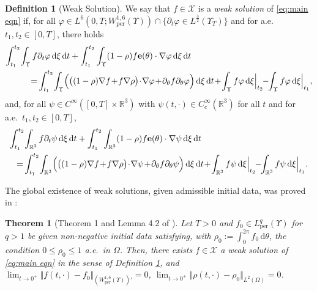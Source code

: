 \documentclass[11pt,a4paper,reqno]{amsart}
\newtheorem{thm}{Theorem}
\theoremstyle{remark}
\theoremstyle{definition}
\newtheorem{definition}[prop]{Definition}
\numberwithin{equation}{section}
\newcommand{\per}{\mathrm{per}}
\newcommand{\e}{{\bf e}}
\newcommand{\bxi}{\xi}
\renewcommand{\d}{\, \mathrm{d} }
\begin{document}
    \begin{definition}[Weak Solution]\label{def:weak sol}
        We say that $f \in \mathcal{X}$ is a \emph{weak solution} of \eqref{eq:main eqn} if, for all $\varphi \in L^6(0,T;W^{1,6}_\per(\Upsilon)) \cap\{\partial_t \varphi \in L^{\frac{3}{2}}(\Upsilon_T)\}$ and for a.e.~$t_1,t_2 \in [0,T]$, there holds 
  \begin{equation}\label{eq:weak sol}
    \begin{aligned}
     \int_{t_1}^{t_2}\! \int_{\Upsilon} f & \partial_t \varphi \d \bxi \d t + \int_{t_1}^{t_2} \int_{\Upsilon} (1-\rho) f \e(\theta) \cdot \nabla \varphi \d \bxi \d t \\ 
      =&\int_{t_1}^{t_2} \!\int_{\Upsilon} \!\Big( \big((1-\rho)\nabla f \!+\! f \nabla \rho \big) \!\cdot\! \nabla \varphi \!+\! \partial_\theta f\partial_\theta \varphi \Big) \d \bxi \d t \!+\! \int_{\Upsilon} f \varphi \d\bxi \Big|_{t_2} \!\!-\!\! \int_{\Upsilon} f \varphi \d\bxi \Big|_{t_1}, 
    \end{aligned}
\end{equation}
        and, for all $\psi \in C^\infty([0,T]\times\mathbb{R}^3)$ with $\psi(t,\cdot) \in C^\infty_c(\mathbb{R}^3)$ for all $t$ and for a.e.~$t_1,t_2 \in [0,T]$, 
      \begin{equation}\label{eq:weak sense eq}
    \begin{aligned}
      \int_{t_1}^{t_2}\! & \int_{\mathbb{R}^3} f  \partial_t \psi \d \bxi \d t + \int_{t_1}^{t_2} \int_{\mathbb{R}^3} (1-\rho) f \e(\theta) \cdot \nabla \psi \d \bxi \d t \\ 
      =&\int_{t_1}^{t_2} \!\int_{\mathbb{R}^3} \!\Big( \big((1-\rho)\nabla f \!+\! f \nabla \rho \big) \!\cdot\! \nabla \psi \!+\! \partial_\theta f\partial_\theta \psi \Big) \d \bxi \d t \!+\! \int_{\mathbb{R}^3} f \psi \d\bxi \Big|_{t_2} \!\!-\!\! \int_{\mathbb{R}^3} f \psi \d\bxi \Big|_{t_1}. 
    \end{aligned}
\end{equation}
    \end{definition}

The global existence of weak solutions, given admissible initial data, was proved in \cite{Martin}:



    \begin{thm}[Theorem 1 and Lemma 4.2 of \cite{Martin}]\label{rem:existence of weak sol}
Let $T>0$ and $f_0 \in L^q_\per(\Upsilon)$ for $q>1$ be given non-negative initial data satisfying, with $\rho_0 := \int_0^{2\pi} f_0 \d \theta$, the condition $0 \leq \rho_0 \leq 1$ {a.e.~in }$\Omega$. Then, there exists $f \in \mathcal{X}$ a weak solution of \eqref{eq:main eqn} in the sense of Definition \ref{def:weak sol}, and $\lim_{t \to 0^+} \Vert f(t,\cdot) - f_0 \Vert_{(W^{1,6}_\per(\Upsilon))'} = 0$, $\lim_{t \to 0^+} \Vert \rho(t,\cdot) - \rho_0 \Vert_{L^2(\Omega)} = 0$. 
\end{thm}
\end{document}
